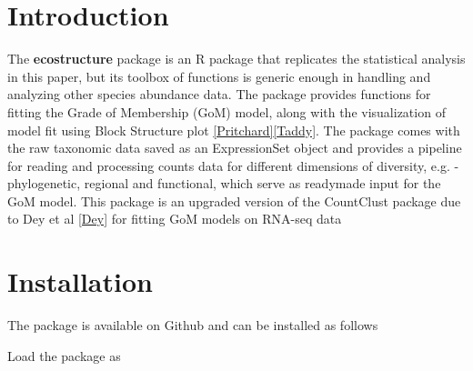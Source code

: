 \documentclass[12pt]{article}
\begin{document}
\maketitle

\section{Introduction}

The \textbf{ecostructure} package is an R package that replicates the statistical analysis in this paper, but its toolbox of functions is generic enough in handling and analyzing other species abundance data. The package provides functions for fitting the Grade of Membership (GoM) model, along with the visualization of model fit using Block Structure plot \ref{Pritchard}\ref{Taddy}. The package comes with the raw taxonomic data saved as an ExpressionSet object and provides a pipeline for reading and processing counts data for different dimensions of diversity, e.g. - phylogenetic, regional and functional, which serve as readymade input for the GoM model. This package is an upgraded version of the CountClust package due to Dey et al \ref{Dey} for fitting GoM models on RNA-seq data

\section{Installation}

The package is available on Github and can be installed as follows



\begin{knitrout}
\color{fgcolor}\begin{kframe}
\begin{alltt}
\hlstd{(}\hlstd{)}
\end{alltt}
\end{kframe}
\end{knitrout}

Load the package as

\begin{knitrout}
\color{fgcolor}\begin{kframe}
\begin{alltt}
\end{alltt}
\end{kframe}
\end{knitrout}
\end{document}
